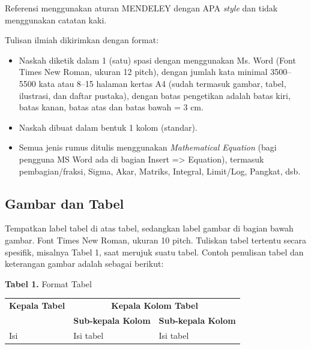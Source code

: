 \vspace{4pt}
\noindent Referensi menggunakan aturan MENDELEY dengan APA \textit{style} dan tidak
menggunakan catatan kaki.

\vspace{12pt}
\noindent\colorbox{yellow!70}{\parbox{\dimexpr\linewidth-2\fboxsep}{Tulisan ilmiah dikirimkan dengan format:}}

\begin{itemize}[leftmargin=1.6cm]
    \item Naskah diketik dalam 1 (satu) spasi dengan menggunakan Ms. Word (Font
          Times New Roman, ukuran 12 pitch), dengan jumlah kata minimal 3500--5500
          kata atau 8--15 halaman kertas A4 (sudah termasuk gambar, tabel, ilustrasi,
          dan daftar pustaka), dengan batas pengetikan adalah batas kiri, batas kanan,
          batas atas dan batas bawah = 3 cm.
    \item Naskah dibuat dalam bentuk 1 kolom (standar).
    \item Semua jenis rumus ditulis menggunakan \textit{Mathematical Equation} (bagi
          pengguna MS Word ada di bagian Insert => Equation), termasuk
          pembagian/fraksi, Sigma, Akar, Matriks, Integral, Limit/Log, Pangkat, dsb.
\end{itemize}

\vspace{10pt}
\subsection{Gambar dan Tabel}
\noindent Tempatkan label tabel di atas tabel, sedangkan label gambar di bagian bawah gambar. Font
Times New Roman, ukuran 10 pitch. Tuliskan tabel tertentu secara spesifik, misalnya
Tabel 1, saat merujuk suatu tabel. Contoh penulisan tabel dan keterangan gambar adalah
sebagai berikut:

\begin{center}
    \footnotesize
    \textbf{Tabel 1.} Format Tabel\\[4pt]
    \renewcommand{\arraystretch}{1.3}
    \begin{tabular}{p{2.4cm}p{3.4cm}p{3.4cm}}
        \hline
        \textbf{Kepala Tabel} & \multicolumn{2}{c}{\textbf{Kepala Kolom Tabel}}                             \\
                              & \textbf{Sub-kepala Kolom}                       & \textbf{Sub-kepala Kolom} \\
        \hline
        Isi                   & Isi tabel                                       & Isi tabel                 \\
        \hline
    \end{tabular}
\end{center}

